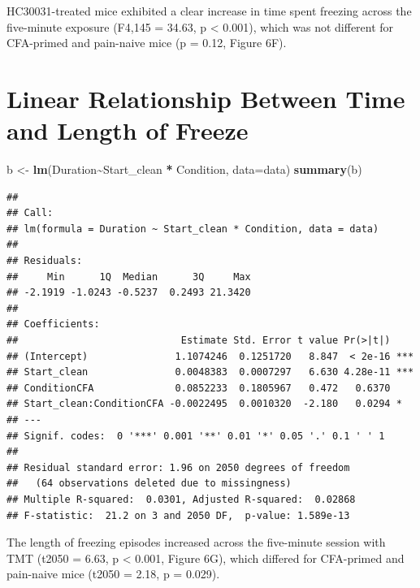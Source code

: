 \documentclass[
]{book}
\newenvironment{Shaded}{\begin{snugshade}}{\end{snugshade}}
\newcommand{\AttributeTok}[1]{\textcolor[rgb]{0.13,0.29,0.53}{#1}}
\newcommand{\FunctionTok}[1]{\textcolor[rgb]{0.13,0.29,0.53}{\textbf{#1}}}
\newcommand{\NormalTok}[1]{#1}
\newcommand{\OtherTok}[1]{\textcolor[rgb]{0.56,0.35,0.01}{#1}}
\newcommand{\SpecialCharTok}[1]{\textcolor[rgb]{0.81,0.36,0.00}{\textbf{#1}}}
\newcommand{\StringTok}[1]{\textcolor[rgb]{0.31,0.60,0.02}{#1}}
\begin{document}
HC30031-treated mice exhibited a clear increase in time spent freezing across the five-minute exposure (F4,145 = 34.63, p \textless{} 0.001), which was not different for CFA-primed and pain-naive mice (p = 0.12, Figure 6F).

\section*{Linear Relationship Between Time and Length of Freeze}\label{linear-relationship-between-time-and-length-of-freeze}

\begin{Shaded}
\begin{Highlighting}[]
\NormalTok{b }\OtherTok{\textless{}{-}} \FunctionTok{lm}\NormalTok{(Duration}\SpecialCharTok{\textasciitilde{}}\NormalTok{Start\_clean }\SpecialCharTok{*}\NormalTok{ Condition, }\AttributeTok{data=}\NormalTok{data)}
\FunctionTok{summary}\NormalTok{(b)}
\end{Highlighting}
\end{Shaded}

\begin{verbatim}
## 
## Call:
## lm(formula = Duration ~ Start_clean * Condition, data = data)
## 
## Residuals:
##     Min      1Q  Median      3Q     Max 
## -2.1919 -1.0243 -0.5237  0.2493 21.3420 
## 
## Coefficients:
##                            Estimate Std. Error t value Pr(>|t|)    
## (Intercept)               1.1074246  0.1251720   8.847  < 2e-16 ***
## Start_clean               0.0048383  0.0007297   6.630 4.28e-11 ***
## ConditionCFA              0.0852233  0.1805967   0.472   0.6370    
## Start_clean:ConditionCFA -0.0022495  0.0010320  -2.180   0.0294 *  
## ---
## Signif. codes:  0 '***' 0.001 '**' 0.01 '*' 0.05 '.' 0.1 ' ' 1
## 
## Residual standard error: 1.96 on 2050 degrees of freedom
##   (64 observations deleted due to missingness)
## Multiple R-squared:  0.0301, Adjusted R-squared:  0.02868 
## F-statistic:  21.2 on 3 and 2050 DF,  p-value: 1.589e-13
\end{verbatim}

The length of freezing episodes increased across the five-minute session with TMT (t2050 = 6.63, p \textless{} 0.001, Figure 6G), which differed for CFA-primed and pain-naive mice (t2050 = 2.18, p = 0.029).

\begin{Shaded}
\end{Shaded}
\end{document}
